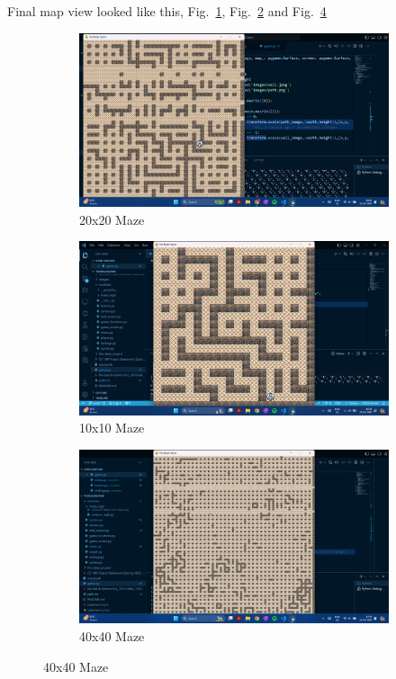 \documentclass{article}
\begin{document}
Final map view looked like this, Fig.~\ref{fig:map3}, Fig.~\ref{fig:map4} and Fig.~\ref{fig:map5}

\begin{figure}[h]
    \caption[1]{}
    \centering
    \begin{subfigure}[b]{0.4\textwidth}
        \includegraphics[width=\textwidth]{screenshots/Screenshot (170).png}
        \caption[(a)]{20x20 Maze}
        \label{fig:map3}
    \end{subfigure}
    \hfil
    \begin{subfigure}[b]{0.4\textwidth}
        \includegraphics[width=\textwidth]{screenshots/Screenshot (172).png}
        \caption[(a)]{10x10 Maze}
        \label{fig:map4}
    \end{subfigure}
    \begin{subfigure}[r]{0.5\textwidth}
        \includegraphics[width=\textwidth]{screenshots/Screenshot (171).png}
        \caption[(a)]{40x40 Maze}
        \label{fig:map5}
    \end{subfigure}
\end{figure}
\end{document}
